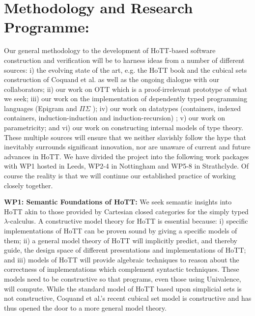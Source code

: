 \documentclass[a4paper,11pt]{article}
\begin{document}
\section{Methodology and Research Programme:}



Our general methodology to the development of HoTT-based software
construction and verification will be to harness ideas from a number
of different sources: i) the evolving state of the art, e.g. the HoTT
book and the cubical sets construction of Coquand et al. as well as
the ongoing dialogue with our collaborators; ii) our work on OTT which
is a proof-irrelevant prototype of what we seek; iii) our work on the
implementation of dependently typed programming languages (Epigram and
$\Pi\Sigma$ \cite{alti:pisigma-new,alti:checking}); iv) our work on datatypes (containers, indexed
containers, induction-induction and induction-recursion) 
\cite{alti:fossacs03,alti:tlca03,alti:icalp04,alti:jpartial,alti:mpc04,alti:cont-tcs,alti:regular,alti:cats07,alti:jcats07,alti:lics09,
alti:catind2}
 ; v) our work
on parametricity; and vi) our work on constructing internal models of
type theory. These multiple sources will ensure that we neither
slavishly follow the hype that inevitably surrounds significant
innovation, nor are unaware of current and future advances in HoTT. We
have divided the project into the following work packages with WP1
hosted in Leeds, WP2-4 in Nottingham and WP5-8 in Strathclyde. Of course
the reality is that we will continue our established practice of
working closely together.


{\bf WP1: Semantic Foundations of HoTT:}  We
seek semantic insights into HoTT akin to those provided by Cartesian
closed categories for the simply typed
$\lambda$-calculus.  A constructive model theory for HoTT is essential because: i)
specific implementations of HoTT can be proven sound by giving a specific
models of them; ii) 
a general model theory of HoTT will implicitly predict, and thereby
guide, the design space of different presentations and implementations
of HoTT; and iii) models of HoTT will provide algebraic techniques to
reason about the correctness of implementations which complement
syntactic techniques. These models need to be constructive so that
programs, even those using Univalence, will compute. While the
standard model of HoTT based upon simplicial sets is not constructive,
Coquand et al.'s recent cubical set model is constructive and 
has thus opened the door to a more general model theory.
\end{document}
